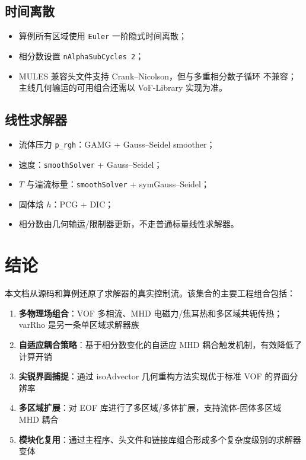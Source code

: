 \documentclass[11pt,a4paper]{article}
\begin{document}
\subsection{时间离散}

\begin{itemize}
    \item 算例所有区域使用 \texttt{Euler} 一阶隐式时间离散；
    \item 相分数设置 \texttt{nAlphaSubCycles 2}；
    \item MULES 兼容头文件支持 Crank--Nicolson，但与多重相分数子循环
    不兼容；主线几何输运的可用组合还需以 VoF-Library 实现为准。
\end{itemize}

\subsection{线性求解器}

\begin{itemize}
    \item 流体压力 \texttt{p\_rgh}：GAMG + Gauss--Seidel smoother；
    \item 速度：\texttt{smoothSolver} + Gauss--Seidel；
    \item $T$ 与湍流标量：\texttt{smoothSolver} + symGauss--Seidel；
    \item 固体焓 $h$：PCG + DIC；
    \item 相分数由几何输运/限制器更新，不走普通标量线性求解器。
\end{itemize}

\section{结论}

本文档从源码和算例还原了求解器的真实控制流。该集合的主要工程组合包括：

\begin{enumerate}
    \item \textbf{多物理场组合}：VOF 多相流、MHD 电磁力/焦耳热和多区域共轭传热；varRho 是另一条单区域求解器族
    \item \textbf{自适应耦合策略}：基于相分数变化的自适应 MHD 耦合触发机制，有效降低了计算开销
    \item \textbf{尖锐界面捕捉}：通过 isoAdvector 几何重构方法实现优于标准 VOF 的界面分辨率
    \item \textbf{多区域扩展}：对 EOF 库进行了多区域/多体扩展，支持流体-固体多区域 MHD 耦合
    \item \textbf{模块化复用}：通过主程序、头文件和链接库组合形成多个复杂度级别的求解器变体
\end{enumerate}
\end{document}
